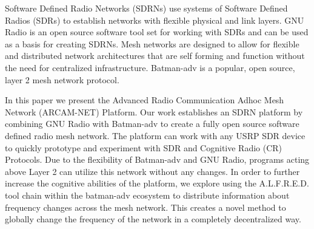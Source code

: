 Software Defined Radio Networks (SDRNs)  use systems of Software Defined Radios (SDRs) to establish networks with flexible physical and link layers. GNU Radio is an open source software tool set for working with SDRs and can be used as a basis for creating SDRNs. Mesh networks are designed to allow for flexible and distributed network architectures that are self forming and function without the need for centralized infrastructure. Batman-adv is a popular, open source, layer 2 mesh network protocol.

In this paper we present the Advanced Radio Communication Adhoc Mesh Network (ARCAM-NET) Platform. Our work establishes an SDRN platform by combining GNU Radio with Batman-adv to create a fully open source software defined radio mesh network. The platform can work with any USRP SDR device to quickly prototype and experiment with SDR and Cognitive Radio (CR) Protocols. Due to the flexibility of Batman-adv and GNU Radio, programs acting above Layer 2 can utilize this network without any changes. In order to further increase the cognitive abilities of the platform, we explore using the A.L.F.R.E.D. tool chain within the batman-adv ecosystem to distribute information about frequency changes across the mesh network. This creates a novel method to globally change the frequency of the network in a completely decentralized way. 

